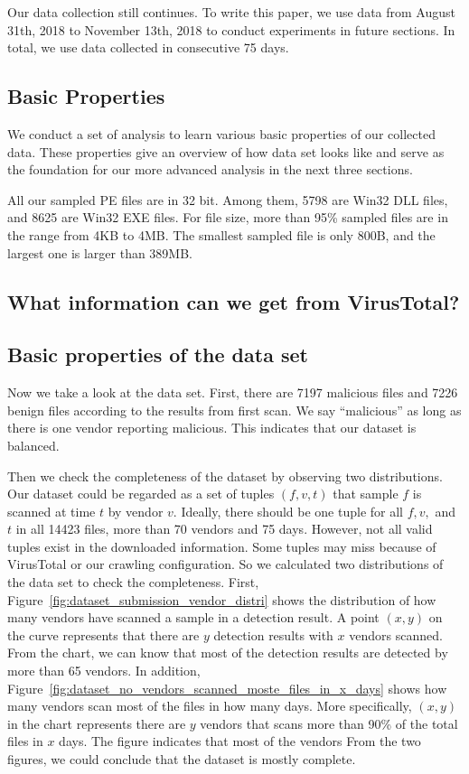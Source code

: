 Our data collection still continues. 
To write this paper, we use data from August 31th, 2018 to 
November 13th, 2018 to conduct experiments in future sections. 
In total, we use data collected in consecutive 75 days. 

\subsection{Basic Properties}


We conduct a set of analysis 
to learn various basic properties of our collected data.
These properties give an overview of how data set looks like
and serve as the foundation for our more 
advanced analysis in the next three sections. 

All our sampled PE files are in 32 bit. 
Among them, 5798 are Win32 DLL files, 
and 8625 are Win32 EXE files.
For file size, more than 95\% sampled 
files are in the range from 4KB to 4MB. 
The smallest sampled file is only 800B, 
and the largest one is larger than 389MB.


\subsection{What information can we get from VirusTotal?}%


\subsection{Basic properties of the data set}

Now we take a look at the data set. First, there are 7197 malicious files and 7226 benign files according to the results from first scan. We say ``malicious'' as long as there is one vendor reporting malicious. This indicates that our dataset is balanced.

Then we check the completeness of the dataset by observing two distributions. 
Our dataset could be regarded as a set of tuples $(f, v, t)$ that sample $f$ is scanned at time $t$ by vendor $v$. Ideally, there should be one tuple for all $f, v, $ and $t$ in all 14423 files, more than 70 vendors and 75 days. 
However, not all valid tuples exist in the downloaded information. Some tuples may miss because of VirusTotal or our crawling configuration. So we calculated two distributions of the data set to check the completeness.
First, Figure~\ref{fig:dataset_submission_vendor_distri} shows the distribution of how many vendors have scanned a sample in a detection result. A point $(x, y)$ on the curve represents that there are $y$ detection results with $x$ vendors scanned. From the chart, we can know that most of the detection results are detected by more than 65 vendors. 
In addition, Figure~\ref{fig:dataset_no_vendors_scanned_moste_files_in_x_days} shows  how many vendors scan most of the files in how many days. More specifically, $(x, y)$ in the chart represents there are $y$ vendors that scans more than 90\% of the total files in $x$ days. The figure indicates that most of the vendors 
From the two figures, we could conclude that the dataset is mostly complete.

